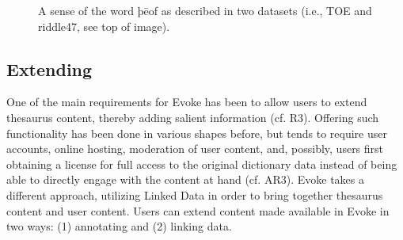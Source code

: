 \begin{figure}[htbp]
	\caption[]{\label{fig:Stolk2021a:Fig9} A sense of the word þēof as described in two datasets (i.e., TOE and riddle47, see top of image).}
\end{figure}

\subsection{Extending}
One of the main requirements for Evoke has been to allow users to extend thesaurus content, thereby adding salient information (cf. R3). Offering such functionality has been done in various shapes before, but tends to require user accounts, online hosting, moderation of user content, and, possibly, users first obtaining a license for full access to the original dictionary data instead of being able to directly engage with the content at hand (cf. AR3). Evoke takes a different approach, utilizing Linked Data in order to bring together thesaurus content and user content. Users can extend content made available in Evoke in two ways: (1) annotating and (2) linking data.

